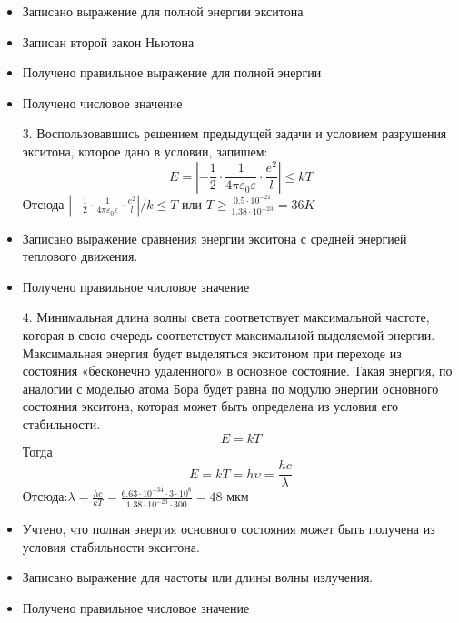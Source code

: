 \documentclass[a4paper, 12pt, oneside]{book}
\begin{document}
\additionalCriteria
\begin{itemize}
\item Записано выражение для полной энергии экситона 
\item Записан второй закон Ньютона
\item Получено правильное выражение для полной энергии
\item Получено числовое значение
\end{itemize}
\begin{enumerate}
\item[3.] Воспользовавшись решением предыдущей задачи и условием разрушения экситона, которое дано в условии, запишем:
$$E=\left|-\frac{1}{2}\cdot\frac{1}{4\pi\varepsilon_0\varepsilon}\cdot\frac{e^2}{l}\right|\leqslant kT$$
Отсюда $\left|-\frac{1}{2}\cdot\frac{1}{4\pi\varepsilon_0\varepsilon}\cdot\frac{e^2}{l}\right|/k\leqslant T$ или $T \geqslant\frac{0.5\cdot10^{-21}}{1.38\cdot10^{-23}}=36K$\\
\end{enumerate}
\additionalCriteria\begin{itemize}
\item Записано выражение сравнения энергии экситона с средней энергией теплового движения.
\item Получено правильное числовое значение
\end{itemize}
\begin{enumerate}
\item[4.] Минимальная длина волны света соответствует максимальной частоте, которая в свою очередь соответствует максимальной выделяемой энергии. Максимальная энергия будет выделяться экситоном при переходе из состояния «бесконечно удаленного» в основное состояние. Такая энергия, по аналогии с моделью атома Бора будет равна по модулю энергии основного состояния экситона, которая может быть определена из условия его стабильности.\\
$$E=kT$$
Тогда 
$$E=kT=h\upsilon=\frac{hc}{\lambda}$$
Отсюда:$\lambda=\frac{hc}{kT}=\frac{6.63\cdot10^{-34}\cdot3\cdot10^8}{1.38\cdot10^{-23}\cdot300}=48$ мкм\\
\end{enumerate}
\additionalCriteria
\begin{itemize}
\item Учтено, что полная энергия основного состояния может быть получена из условия стабильности экситона.
\item Записано выражение для частоты или длины волны излучения.
\item Получено правильное числовое значение
\end{itemize}
\end{document}
